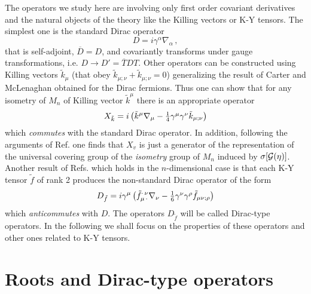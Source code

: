 \documentclass[a4paper,12pt]{article}
\begin{document}
The operators we study here are involving only first order covariant 
derivatives and the natural objects of the theory like the Killing vectors or 
K-Y tensors. The simplest one is the  standard Dirac operator   
\begin{equation}\label{Dirac}
D=i\gamma^{\alpha}\nabla_{\alpha}\,,   
\end{equation}
that is self-adjoint, $\overline{D}=D$, and covariantly transforms 
under gauge transformations, i.e. $D\to D'=\overline{T}DT$. Other operators 
can be constructed using  Killing vectors $\tilde k_{\mu}$ (that obey 
$\tilde k_{\mu;\nu}+\tilde k_{\mu;\nu}=0$) generalizing the result of Carter 
and McLenaghan \cite{CML} obtained for the Dirac fermions. Thus one can show 
that for any 
isometry of $M_n$ of Killing vector $\tilde k^\mu$ there is an appropriate 
operator 
\begin{equation}\label{kil}
X_{\tilde k} = i \left(\tilde k^\mu \nabla_\mu - \textstyle{1\over 4} 
\gamma^\mu \gamma^\nu 
\tilde k_{\mu;\nu}\right)
\end{equation}
which {\em commutes} with the standard Dirac operator. In addition, following 
the arguments of Ref. \cite{ES} one finds that $X_v$ is just a generator of 
the representation of the universal covering group of the {\em isometry} 
group of $M_n$ induced by $\sigma[{\cal G}(\eta)]$. Another result of 
Refs. \cite{CML, MLS, KML} which holds in the $n$-dimensional case is that
each K-Y tensor $\tilde f$ of rank 2 produces the non-standard Dirac operator 
of the form 
\begin{equation}\label{df}
D_{\tilde f} = i\gamma^\mu \left(\tilde f_{\mu\,\cdot}^{\cdot\,\nu}\nabla_\nu  
- \textstyle{1\over 6}\gamma^\nu 
\gamma^\rho \tilde f_{\mu\nu;\rho}\right)
\end{equation}
which {\em anticommutes} with  $D$. The operators $D_{\tilde f}$ 
will be called Dirac-type operators. 
In the following we shall focus on the properties of these  operators 
and other ones related to  K-Y tensors. 

\section{Roots and Dirac-type operators}
\end{document}
